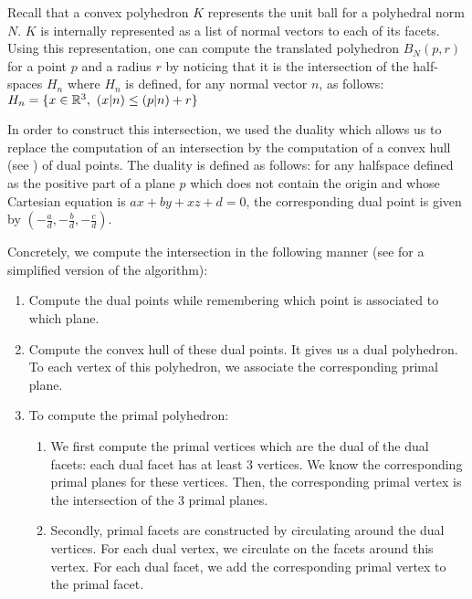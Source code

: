 Recall that a convex polyhedron $ K $ represents the unit ball for a polyhedral
norm $ N $. $ K $ is internally represented as a list of normal vectors to each
of its facets. Using this representation, one can compute the translated
polyhedron $ B_N(p, r) $ for a point $ p $ and a radius $ r $ by noticing that
it is the intersection of the half-spaces $ H_n $ where $ H_n $ is defined, for
any normal vector $ n $, as follows: $ H_n = \{ x \in \mathbb{R}^3,~ (x | n) \leq (p |
n) + r \} $

In order to construct this intersection, we used the duality which allows us to
replace the computation of an intersection by the computation of a convex hull
(see \cite{preparata1979finding}) of dual points. The duality is defined as
follows: for any halfspace defined as the positive part of a plane $ p $ which
does not contain the origin and whose Cartesian equation is $ ax + by + xz + d =
0 $, the corresponding dual point is given by $ (-\frac{a}{d}, -\frac{b}{d},
-\frac{c}{d}) $.

Concretely, we compute the intersection in the following manner (see
 for a simplified version of the
algorithm):
\begin{enumerate}
    \item Compute the dual points while remembering which point is associated to
        which plane.
    \item Compute the convex hull of these dual points. It gives us a dual
        polyhedron. To each vertex of this polyhedron, we associate the
        corresponding primal plane.
    \item To compute the primal polyhedron:
        \begin{enumerate}
            \item We first compute the primal vertices which are the dual of the
                dual facets: each dual facet has at least 3 vertices. We know
                the corresponding primal planes for these vertices.  Then, the
                corresponding primal vertex is the intersection of the 3 primal
                planes.
            \item Secondly, primal facets are constructed by circulating
                around the dual vertices. For each dual vertex, we circulate
                on the facets around this vertex. For each dual facet, we add the
                corresponding primal vertex to the primal facet.
        \end{enumerate}
\end{enumerate}

